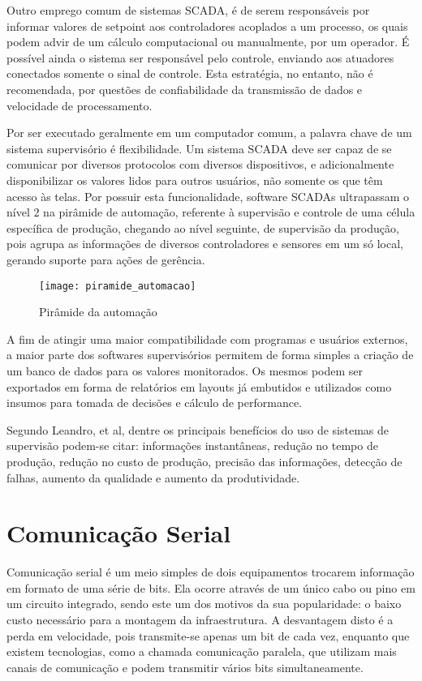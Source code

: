 Outro emprego comum de sistemas SCADA, é de serem responsáveis por informar valores de setpoint aos controladores acoplados a um processo, os quais podem advir de um cálculo computacional ou manualmente, por um operador. É possível ainda o sistema ser responsável pelo controle, enviando aos atuadores conectados somente o sinal de controle. Esta estratégia, no entanto, não é recomendada, por questões de confiabilidade da transmissão de dados e velocidade de processamento.

Por ser executado geralmente em um computador comum, a palavra chave de um sistema supervisório é flexibilidade. Um sistema SCADA deve ser capaz de se comunicar por diversos protocolos com diversos dispositivos, e adicionalmente disponibilizar os valores lidos para outros usuários, não somente os que têm acesso às telas. Por possuir esta funcionalidade, software SCADAs ultrapassam o nível 2 na pirâmide de automação, referente à supervisão e controle de uma célula específica de produção, chegando ao nível seguinte, de supervisão da produção, pois agrupa as informações de diversos controladores e sensores em um só local, gerando suporte para ações de gerência.

\begin{figure}
	\centering
	\texttt{[image: piramide\_automacao]}
	\caption{Pirâmide da automação}
	\label{img_piramide_automacao}
\end{figure}

A fim de atingir uma maior compatibilidade com programas e usuários externos, a maior parte dos softwares supervisórios permitem de forma simples a criação de um banco de dados para os valores monitorados. Os mesmos podem ser exportados em forma de relatórios em layouts já embutidos e utilizados como insumos para tomada de decisões e cálculo de performance.

Segundo Leandro, et al, dentre os principais benefícios do uso de sistemas de supervisão podem-se citar: informações instantâneas, redução no tempo de produção, redução no custo de produção, precisão das informações, detecção de falhas, aumento da qualidade e aumento da produtividade.

\section{Comunicação Serial}

Comunicação serial é um meio simples de dois equipamentos trocarem informação em formato de uma série de bits. Ela ocorre através de um único cabo ou pino em um circuito integrado, sendo este um dos motivos da sua popularidade: o baixo custo necessário para a montagem da infraestrutura. A desvantagem disto é a perda em velocidade, pois transmite-se apenas um bit de cada vez, enquanto que existem tecnologias, como a chamada comunicação paralela, que utilizam mais canais de comunicação e podem transmitir vários bits simultaneamente.


